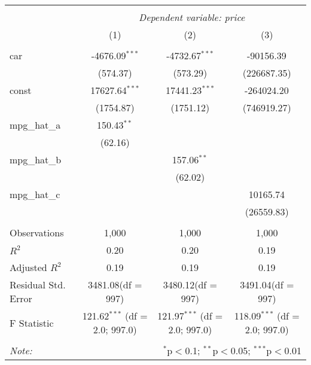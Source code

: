 \begin{table}[!htbp] \centering
\begin{tabular}{@{\extracolsep{5pt}}lccc}
\\[-1.8ex]\hline
\hline \\[-1.8ex]
& \multicolumn{3}{c}{\textit{Dependent variable: price}} \
\cr \cline{3-4}
\\[-1.8ex] & (1) & (2) & (3) \\
\hline \\[-1.8ex]
 car & -4676.09$^{***}$ & -4732.67$^{***}$ & -90156.39$^{}$ \\
  & (574.37) & (573.29) & (226687.35) \\
 const & 17627.64$^{***}$ & 17441.23$^{***}$ & -264024.20$^{}$ \\
  & (1754.87) & (1751.12) & (746919.27) \\
 mpg_hat_a & 150.43$^{**}$ & & \\
  & (62.16) & & \\
 mpg_hat_b & & 157.06$^{**}$ & \\
  & & (62.02) & \\
 mpg_hat_c & & & 10165.74$^{}$ \\
  & & & (26559.83) \\
\hline \\[-1.8ex]
 Observations & 1,000 & 1,000 & 1,000 \\
 $R^2$ & 0.20 & 0.20 & 0.19 \\
 Adjusted $R^2$ & 0.19 & 0.19 & 0.19 \\
 Residual Std. Error & 3481.08(df = 997) & 3480.12(df = 997) & 3491.04(df = 997)  \\
 F Statistic & 121.62$^{***}$ (df = 2.0; 997.0) & 121.97$^{***}$ (df = 2.0; 997.0) & 118.09$^{***}$ (df = 2.0; 997.0) \\
\hline
\hline \\[-1.8ex]
\textit{Note:} & \multicolumn{3}{r}{$^{*}$p$<$0.1; $^{**}$p$<$0.05; $^{***}$p$<$0.01} \\
\end{tabular}
\end{table}